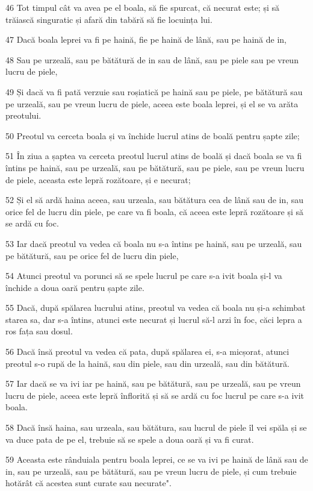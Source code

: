\par 46 Tot timpul cât va avea pe el boala, să fie spurcat, că necurat este; și să trăiască singuratic și afară din tabără să fie locuința lui.
\par 47 Dacă boala leprei va fi pe haină, fie pe haină de lână, sau pe haină de in,
\par 48 Sau pe urzeală, sau pe bătătură de in sau de lână, sau pe piele sau pe vreun lucru de piele,
\par 49 Și dacă va fi pată verzuie sau roșiatică pe haină sau pe piele, pe bătătură sau pe urzeală, sau pe vreun lucru de piele, aceea este boala leprei, și el se va arăta preotului.
\par 50 Preotul va cerceta boala și va închide lucrul atins de boală pentru șapte zile;
\par 51 În ziua a șaptea va cerceta preotul lucrul atins de boală și dacă boala se va fi întins pe haină, sau pe urzeală, sau pe bătătură, sau pe piele, sau pe vreun lucru de piele, aceasta este lepră rozătoare, și e necurat;
\par 52 Și el să ardă haina aceea, sau urzeala, sau bătătura cea de lână sau de in, sau orice fel de lucru din piele, pe care va fi boala, că aceea este lepră rozătoare și să se ardă cu foc.
\par 53 Iar dacă preotul va vedea că boala nu s-a întins pe haină, sau pe urzeală, sau pe bătătură, sau pe orice fel de lucru din piele,
\par 54 Atunci preotul va porunci să se spele lucrul pe care s-a ivit boala și-l va închide a doua oară pentru șapte zile.
\par 55 Dacă, după spălarea lucrului atins, preotul va vedea că boala nu și-a schimbat starea sa, dar s-a întins, atunci este necurat și lucrul să-l arzi în foc, căci lepra a ros fața sau dosul.
\par 56 Dacă însă preotul va vedea că pata, după spălarea ei, s-a micșorat, atunci preotul s-o rupă de la haină, sau din piele, sau din urzeală, sau din bătătură.
\par 57 Iar dacă se va ivi iar pe haină, sau pe bătătură, sau pe urzeală, sau pe vreun lucru de piele, aceea este lepră înflorită și să se ardă cu foc lucrul pe care s-a ivit boala.
\par 58 Dacă însă haina, sau urzeala, sau bătătura, sau lucrul de piele îl vei spăla și se va duce pata de pe el, trebuie să se spele a doua oară și va fi curat.
\par 59 Aceasta este rânduiala pentru boala leprei, ce se va ivi pe haină de lână sau de in, sau pe urzeală, sau pe bătătură, sau pe vreun lucru de piele, și cum trebuie hotărât că acestea sunt curate sau necurate".

